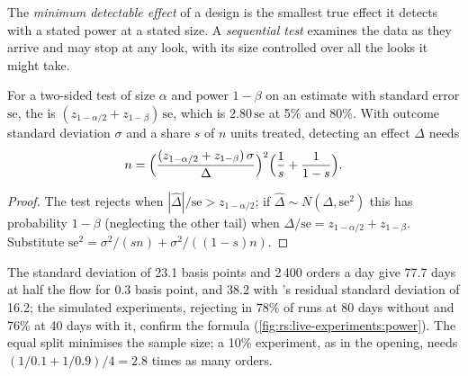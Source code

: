\begin{definition}\label{def:rs:live-experiments:mde}
The \emph{minimum detectable effect} of a design is the smallest true effect it detects with a stated power at a stated size.
A \emph{sequential test} examines the data as they arrive and may stop at any look, with its size controlled over all the looks it
might take.
\end{definition}

\begin{proposition}\label{prop:rs:live-experiments:mde}
For a two-sided test of size $\alpha$ and power $1-\beta$ on an estimate with standard error $\mathrm{se}$, the  is
$(z_{1-\alpha/2} + z_{1-\beta})\,\mathrm{se}$, which is $2.80\,\mathrm{se}$ at 5\% and 80\%. With outcome standard deviation $\sigma$ and a share $s$ of $n$
units treated, detecting an effect $\Delta$ needs
\[
n = \Bigl(\frac{(z_{1-\alpha/2} + z_{1-\beta})\,\sigma}{\Delta}\Bigr)^2\Bigl(\frac1s + \frac1{1-s}\Bigr).
\]
\end{proposition}

\begin{proof}
The test rejects when $|\hat\Delta|/\mathrm{se} > z_{1-\alpha/2}$; if $\hat\Delta \sim N(\Delta, \mathrm{se}^2)$ this has probability $1-\beta$ (neglecting the
other tail) when $\Delta/\mathrm{se} = z_{1-\alpha/2} + z_{1-\beta}$. Substitute $\mathrm{se}^2 = \sigma^2/(sn) + \sigma^2/((1-s)n)$.
\end{proof}

The standard deviation of 23.1 basis points and 2\,400 orders a day give 77.7 days at half the flow for 0.3 basis point, and 38.2 with 's residual
standard deviation of 16.2; the simulated experiments, rejecting in 78\% of runs at 80 days without  and 76\% at 40 days with it, confirm the formula
(\cref{fig:rs:live-experiments:power}). The equal split minimises the sample size; a 10\% experiment, as in the opening, needs $(1/0.1 + 1/0.9)/4 = 2.8$
times as many orders.

